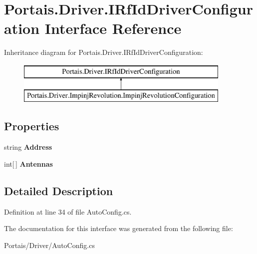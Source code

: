 \hypertarget{interface_portais_1_1_driver_1_1_i_rf_id_driver_configuration}{}\section{Portais.\+Driver.\+I\+Rf\+Id\+Driver\+Configuration Interface Reference}
\label{interface_portais_1_1_driver_1_1_i_rf_id_driver_configuration}
Inheritance diagram for Portais.\+Driver.\+I\+Rf\+Id\+Driver\+Configuration\+:\begin{figure}[H]
\begin{center}
\leavevmode
\includegraphics[height=2.000000cm]{interface_portais_1_1_driver_1_1_i_rf_id_driver_configuration}
\end{center}
\end{figure}
\subsection*{Properties}
\begin{DoxyCompactItemize}
\item 
string {\bfseries Address}\hypertarget{interface_portais_1_1_driver_1_1_i_rf_id_driver_configuration_abdeaaebbe9ae1fdfed640b19d7bd44dc}{}\label{interface_portais_1_1_driver_1_1_i_rf_id_driver_configuration_abdeaaebbe9ae1fdfed640b19d7bd44dc}

\item 
int\mbox{[}$\,$\mbox{]} {\bfseries Antennas}\hypertarget{interface_portais_1_1_driver_1_1_i_rf_id_driver_configuration_a3915d5ca8eb8619749b14bbb8ebb46ed}{}\label{interface_portais_1_1_driver_1_1_i_rf_id_driver_configuration_a3915d5ca8eb8619749b14bbb8ebb46ed}

\end{DoxyCompactItemize}


\subsection{Detailed Description}


Definition at line 34 of file Auto\+Config.\+cs.



The documentation for this interface was generated from the following file\+:\begin{DoxyCompactItemize}
\item 
Portais/\+Driver/Auto\+Config.\+cs\end{DoxyCompactItemize}
